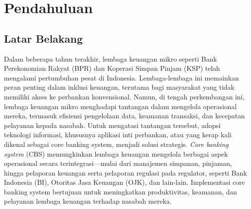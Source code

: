 \documentclass[journal,article,submit,pdftex,moreauthors]{Definitions/mdpi}
\begin{document}



\section{Pendahuluan}

\subsection{Latar Belakang}

Dalam beberapa tahun terakhir, lembaga keuangan mikro seperti Bank Perekonomian Rakyat (BPR) dan Koperasi Simpan Pinjam (KSP) telah mengalami pertumbuhan pesat di Indonesia. Lembaga-lembaga ini memainkan peran penting dalam inklusi keuangan, terutama bagi masyarakat yang tidak memiliki akses ke perbankan konvensional. Namun, di tengah perkembangan ini, lembaga keuangan mikro menghadapi tantangan dalam mengelola operasional mereka, termasuk efisiensi pengelolaan data, keamanan transaksi, dan kecepatan pelayanan kepada nasabah.
Untuk mengatasi tantangan tersebut, adopsi teknologi informasi, khususnya aplikasi inti perbankan, atau yang kerap kali dikenal sebagai core banking system, menjadi solusi strategis. \textit{Core banking system} (CBS) memungkinkan lembaga keuangan mengelola berbagai aspek operasional secara terintegrasi—mulai dari manajemen simpanan, pinjaman, hingga pelaporan keuangan serta pelaporan regulasi pada regulator, seperti Bank Indonesia (BI), Otoritas Jasa Keuangan (OJK), dan lain-lain. Implementasi core banking system bertujuan untuk meningkatkan produktivitas, keamanan, dan pelayanan lembaga keuangan terhadap nasabah mereka.
\end{document}
